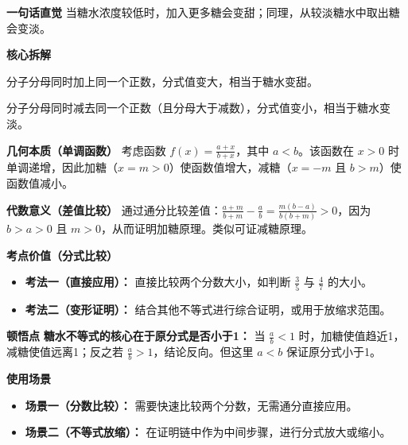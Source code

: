 \begin{explanationbox}
\textbf{\textcolor{CExplanation}{一句话直觉}}
当糖水浓度较低时，加入更多糖会变甜；同理，从较淡糖水中取出糖会变淡。

\medskip
\textbf{\textcolor{CExplanation}{核心拆解}}
\begin{description}[style=nextline, leftmargin=2.8em, labelsep=0.5em, itemsep=0.45em]
    \item[\textbf{要点一（加糖变甜）：}] 分子分母同时加上同一个正数，分式值变大，相当于糖水变甜。
    \item[\textbf{要点二（减糖变淡）：}] 分子分母同时减去同一个正数（且分母大于减数），分式值变小，相当于糖水变淡。
\end{description}

\medskip
\textbf{\textcolor{CExplanation}{几何本质（单调函数）}}
考虑函数 $f(x) = \frac{a+x}{b+x}$，其中 $a<b$。该函数在 $x>0$ 时单调递增，因此加糖（$x=m>0$）使函数值增大，减糖（$x=-m$ 且 $b>m$）使函数值减小。

\medskip
\textbf{\textcolor{CExplanation}{代数意义（差值比较）}}
通过通分比较差值：$\frac{a+m}{b+m} - \frac{a}{b} = \frac{m(b-a)}{b(b+m)} > 0$，因为 $b>a>0$ 且 $m>0$，从而证明加糖原理。类似可证减糖原理。

\medskip
\textbf{\textcolor{CExplanation}{考点价值（分式比较）}}
\begin{itemize}[leftmargin=*, itemsep=0.5em, topsep=0.4em]
    \item \textbf{考法一（直接应用）：} 直接比较两个分数大小，如判断 $\frac{3}{5}$ 与 $\frac{4}{7}$ 的大小。
    \item \textbf{考法二（变形证明）：} 结合其他不等式进行综合证明，或用于放缩求范围。
\end{itemize}

\medskip
\textbf{\textcolor{CExplanation}{顿悟点}}
\textbf{糖水不等式的核心在于原分式是否小于1：} 当 $\frac{a}{b}<1$ 时，加糖使值趋近1，减糖使值远离1；反之若 $\frac{a}{b}>1$，结论反向。但这里 $a<b$ 保证原分式小于1。

\medskip
\textbf{\textcolor{CExplanation}{使用场景}}
\begin{itemize}[leftmargin=*, itemsep=0.5em, topsep=0.4em]
    \item \textbf{场景一（分数比较）：} 需要快速比较两个分数，无需通分直接应用。
    \item \textbf{场景二（不等式放缩）：} 在证明链中作为中间步骤，进行分式放大或缩小。
\end{itemize}
\end{explanationbox}
